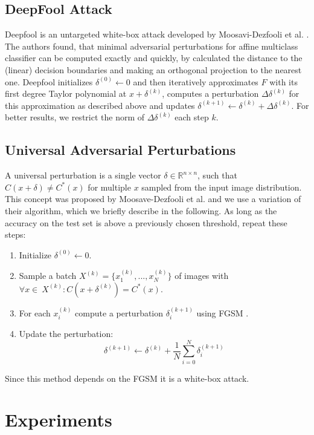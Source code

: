 \documentclass{article}
\begin{document}
\subsection{DeepFool Attack}
Deepfool is an untargeted white-box attack developed by Moosavi-Dezfooli et al. .
The authors found, that minimal adversarial perturbations for affine multiclass classifier can be computed exactly and quickly,
by calculated the distance to the (linear) decision boundaries and making an orthogonal projection to the nearest one.
Deepfool initializes $\delta^{(0)} \gets 0$ and then iteratively approximates $F$ with its first degree Taylor polynomial at $x + \delta^{(k)}$, computes a perturbation $\Delta \delta^{(k)}$ for this approximation as described above and updates $\delta^{(k+1)} \gets \delta^{(k)} + \Delta \delta^{(k)} $.
For better results, we restrict the norm of $\Delta \delta^{(k)} $ each step $k$.

\subsection{Universal Adversarial Perturbations}
\label{sec:universal}
A universal perturbation is a single vector $\delta \in \mathbb{R}^{n\times n}$, such that $C(x + \delta) \neq C^*(x)$ for multiple $x$ sampled from the input image distribution. This concept was proposed by Moosave-Dezfooli et al.  and we use a variation of their algorithm, which we briefly describe in the following. As long as the accuracy on the test set is above a previously chosen threshold, repeat these steps:
\begin{enumerate}
	\item Initialize $\delta^{(0)} \gets 0$.
	\item Sample a batch $X^{(k)} = \{x_1^{(k)}, ..., x_N^{(k)}\}$ of images with $\forall x \in\ X^{(k)}:  C(x + \delta^{(k)}) = C^*(x)$.
	\item For each $x_i^{(k)}$ compute a perturbation $\delta_i^{(k+1)}$ using FGSM \cite{fgsm}.
	\item Update the perturbation: $$\delta^{(k+1)} \gets \delta^{(k)} + \frac{1}{N} \sum\limits_{i=0}^N \delta_i^{(k+1)}$$
\end{enumerate}
Since this method depends on the FGSM it is a white-box attack.


\section{Experiments}
\label{lab:experiments}
\end{document}
